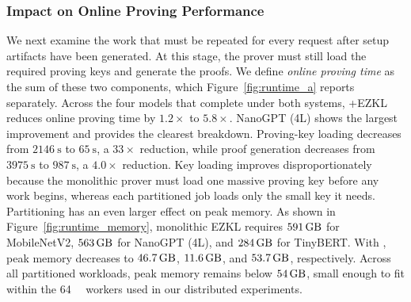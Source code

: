 

\subsubsection{\textbf{Impact on Online Proving Performance}}

We next examine the work that must be repeated for every request after
setup artifacts have been generated. At this stage, the prover must
still load the required proving keys and generate the proofs. We define
\emph{online proving time} as the sum of these two components, which
Figure~\ref{fig:runtime_a} reports separately. Across the four models that complete under both systems, \TITLE{}+EZKL
reduces online proving time by \(\num{1.2}\times\) to
\(\num{5.8}\times\). NanoGPT (4L) shows the largest improvement and
provides the clearest breakdown. Proving-key loading decreases from
\(\qty{2146}{\second}\) to \(\qty{65}{\second}\), a \(\num{33}\times\)
reduction, while proof generation decreases from \(\qty{3975}{\second}\)
to \(\qty{987}{\second}\), a \(\num{4.0}\times\) reduction. Key loading
improves disproportionately because the monolithic prover must load one
massive proving key before any work begins, whereas each partitioned job
loads only the small key it needs. Partitioning has an even larger effect on peak memory. As shown in
Figure~\ref{fig:runtime_memory}, monolithic EZKL requires
\(\qty{591}{\giga\byte}\) for MobileNetV2, \(\qty{563}{\giga\byte}\) for
NanoGPT (4L), and \(\qty{284}{\giga\byte}\) for TinyBERT. With
\TITLE{}, peak memory decreases to \(\qty{46.7}{\giga\byte}\),
\(\qty{11.6}{\giga\byte}\), and \(\qty{53.7}{\giga\byte}\),
respectively. Across all partitioned workloads, peak memory remains below
\(\qty{54}{\giga\byte}\), small enough to fit within the \qty{64}{\giga\byte} workers used
in our distributed experiments.





